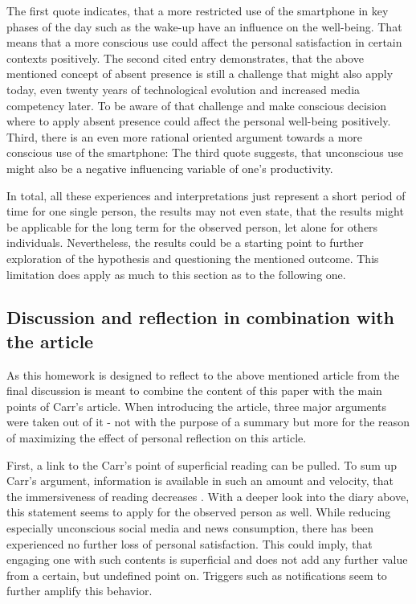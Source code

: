 \documentclass[11pt,a4paper]{article}
\begin{document}
The first quote indicates, that a more restricted use of the smartphone in key phases of the day such as the wake-up have an influence on the well-being. That means that a more conscious use could affect the personal satisfaction in certain contexts positively. The second cited entry demonstrates, that the above mentioned concept of absent presence \cite{Gergen.2002} is still a challenge that might also apply today, even twenty years of technological evolution and increased media competency later. To be aware of that challenge and make conscious decision where to apply absent presence could affect the personal well-being positively. Third, there is an even more rational oriented argument towards a more conscious use of the smartphone: The third quote suggests, that unconscious use might also be a negative influencing variable of one's productivity.

In total, all these experiences and interpretations just represent a short period of time for one single person, the results may not even state, that the results might be applicable for the long term for the observed person, let alone for others individuals. Nevertheless, the results could be a starting point to further exploration of the hypothesis and questioning the mentioned outcome. This limitation does apply as much to this section as to the following one.

\subsection*{Discussion and reflection in combination with the article}
As this homework is designed to reflect to the above mentioned article  from \cite{Carr.2008} the final discussion is meant to combine the content of this paper with the main points of Carr's article. When introducing the article, three major arguments were taken out of it - not with the purpose of a summary but more for the reason of maximizing the effect of personal reflection on this article.

First, a link to the Carr's point of superficial reading can be pulled. To sum up Carr's argument, information is available in such an amount and velocity, that the immersiveness of reading decreases \citep{Carr.2008}. With a deeper look into the diary above, this statement seems to apply for the observed person as well. While reducing especially unconscious social media and news consumption, there has been experienced no further loss of personal satisfaction. This could imply, that engaging one with such contents is superficial and does not add any further value from a certain, but undefined point on. Triggers such as notifications seem to further amplify this behavior.
\end{document}
